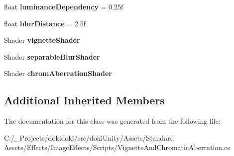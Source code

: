 \begin{DoxyCompactItemize}
\item 
float {\bfseries luminance\+Dependency} = 0.\+25f\hypertarget{class_unity_standard_assets_1_1_image_effects_1_1_vignette_and_chromatic_aberration_a22eb4e810de317ef2f0e72b3780c3300}{}\label{class_unity_standard_assets_1_1_image_effects_1_1_vignette_and_chromatic_aberration_a22eb4e810de317ef2f0e72b3780c3300}

\item 
float {\bfseries blur\+Distance} = 2.\+5f\hypertarget{class_unity_standard_assets_1_1_image_effects_1_1_vignette_and_chromatic_aberration_a5a8659f4b8144ee9684cbdb0fd018ac3}{}\label{class_unity_standard_assets_1_1_image_effects_1_1_vignette_and_chromatic_aberration_a5a8659f4b8144ee9684cbdb0fd018ac3}

\item 
Shader {\bfseries vignette\+Shader}\hypertarget{class_unity_standard_assets_1_1_image_effects_1_1_vignette_and_chromatic_aberration_a50e8b2c6fce44601d55142dbd9eb3c2b}{}\label{class_unity_standard_assets_1_1_image_effects_1_1_vignette_and_chromatic_aberration_a50e8b2c6fce44601d55142dbd9eb3c2b}

\item 
Shader {\bfseries separable\+Blur\+Shader}\hypertarget{class_unity_standard_assets_1_1_image_effects_1_1_vignette_and_chromatic_aberration_a0e40441f82cc813fab01bbc56d897f7f}{}\label{class_unity_standard_assets_1_1_image_effects_1_1_vignette_and_chromatic_aberration_a0e40441f82cc813fab01bbc56d897f7f}

\item 
Shader {\bfseries chrom\+Aberration\+Shader}\hypertarget{class_unity_standard_assets_1_1_image_effects_1_1_vignette_and_chromatic_aberration_ab53f26a839d099d2fb4b5cfeeaa5b60f}{}\label{class_unity_standard_assets_1_1_image_effects_1_1_vignette_and_chromatic_aberration_ab53f26a839d099d2fb4b5cfeeaa5b60f}

\end{DoxyCompactItemize}
\subsection*{Additional Inherited Members}


The documentation for this class was generated from the following file\+:\begin{DoxyCompactItemize}
\item 
C\+:/\+\_\+\+Projects/dokidoki/src/doki\+Unity/\+Assets/\+Standard Assets/\+Effects/\+Image\+Effects/\+Scripts/Vignette\+And\+Chromatic\+Aberration.\+cs\end{DoxyCompactItemize}
